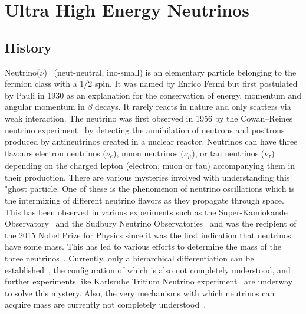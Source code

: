\section{Ultra High Energy Neutrinos}
\label{sec:UHENu}
\subsection{History}
Neutrino($\nu$)~\cite{} (neut-neutral, ino-small) is an elementary particle belonging to the fermion class with a 1/2 spin. It was named by Enrico Fermi but first postulated by Pauli in 1930 as an explanation for the conservation of energy, momentum and angular momentum in $\beta$ decays. It rarely reacts in nature and only scatters via weak interaction. The neutrino was first observed in 1956 by the Cowan–Reines neutrino experiment~\cite{} by detecting the annihilation of neutrons and positrons produced by antineutrinos created in a nuclear reactor. Neutrinos can have three flavours electron neutrinos ($\nu_e$), muon neutrinos ($\nu_{\mu}$), or tau neutrinos ($\nu_{\tau}$) depending on the charged lepton (electron, muon or tau) accompanying them in their production. There are various mysteries involved with understanding this "ghost particle. One of these is the phenomenon of neutrino oscillations which is the intermixing of different neutrino flavors as they propagate through space. This has been observed in various experiments such as the Super-Kamiokande Observatory~\cite{} and the Sudbury Neutrino Observatories~\cite{} and was the recipient of the 2015 Nobel Prize for Physics since it was the first indication that neutrinos have some mass. This has led to various efforts to determine the mass of the three neutrinos~\cite{}. Currently, only a hierarchical differentiation can be established~\cite{}, the configuration of which is also not completely understood, and further experiments like Karlsruhe Tritium Neutrino experiment~\cite{} are underway to solve this mystery. Also, the very mechanisms with which neutrinos can acquire mass are currently not completely understood~\cite{}. 
